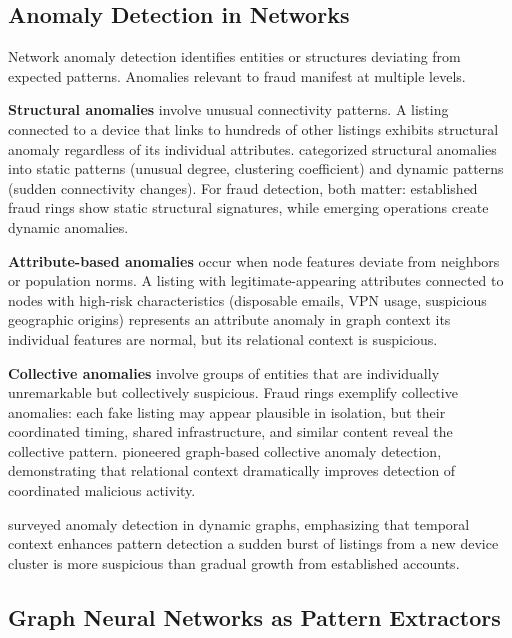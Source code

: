 \subsection{Anomaly Detection in Networks}

Network anomaly detection identifies entities or structures deviating from expected patterns. Anomalies relevant to fraud manifest at multiple levels.

\textbf{Structural anomalies} involve unusual connectivity patterns. A listing connected to a device that links to hundreds of other listings exhibits structural anomaly regardless of its individual attributes. \citeauthor{akoglu2015graph} \cite{akoglu2015graph} categorized structural anomalies into static patterns (unusual degree, clustering coefficient) and dynamic patterns (sudden connectivity changes). For fraud detection, both matter: established fraud rings show static structural signatures, while emerging operations create dynamic anomalies.

\textbf{Attribute-based anomalies} occur when node features deviate from neighbors or population norms. A listing with legitimate-appearing attributes connected to nodes with high-risk characteristics (disposable emails, VPN usage, suspicious geographic origins) represents an attribute anomaly in graph context its individual features are normal, but its relational context is suspicious.

\textbf{Collective anomalies} involve groups of entities that are individually unremarkable but collectively suspicious. Fraud rings exemplify collective anomalies: each fake listing may appear plausible in isolation, but their coordinated timing, shared infrastructure, and similar content reveal the collective pattern. \citeauthor{noble2003graph} \cite{noble2003graph} pioneered graph-based collective anomaly detection, demonstrating that relational context dramatically improves detection of coordinated malicious activity.

\citeauthor{ranshous2015anomaly} \cite{ranshous2015anomaly} surveyed anomaly detection in dynamic graphs, emphasizing that temporal context enhances pattern detection a sudden burst of listings from a new device cluster is more suspicious than gradual growth from established accounts.

\subsection{Graph Neural Networks as Pattern Extractors}

